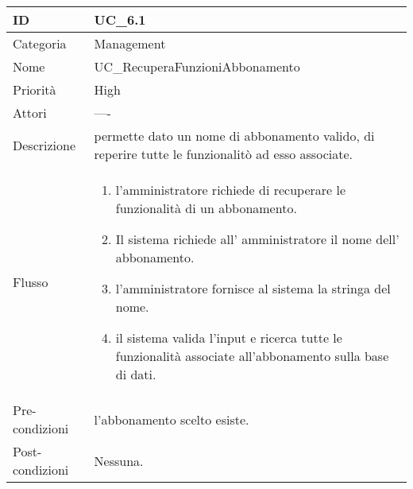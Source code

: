 \begin{center}
\begin{tabular}{ |p{2cm}|p{13cm}|  }
\hline
ID & UC\_6.1 \\\hline
Categoria & Management\\\hline
Nome & UC\_RecuperaFunzioniAbbonamento\\\hline
Priorità & High \\\hline
Attori &  ---- \\\hline
Descrizione & permette dato un nome di abbonamento valido, di reperire tutte le funzionalitò ad esso associate.\\\hline
Flusso &  	\begin{enumerate}
			\item l'amministratore richiede di recuperare le funzionalità di un abbonamento.
			\item Il sistema richiede all' amministratore il nome dell' abbonamento.
			\item l'amministratore fornisce al sistema la stringa del nome.
			\item il sistema valida l'input e ricerca tutte le funzionalità associate all'abbonamento sulla base di dati.
		\end{enumerate}\\\hline
Pre-condizioni &  l'abbonamento scelto esiste.\\\hline
Post-condizioni &  Nessuna.\\\hline
\end{tabular}
\label{table_use_case:6.1}\newline


\end{center}
